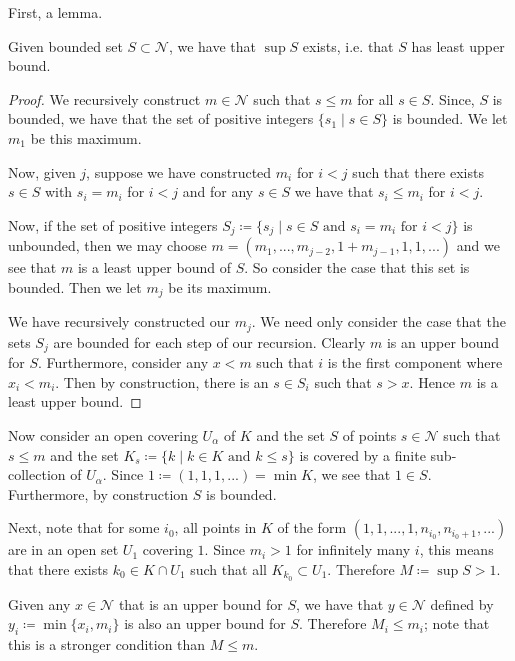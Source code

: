 First, a lemma. 
\begin{lemma}
Given bounded set \(S \subset \mathcal N\), we have that \(\sup S\) exists, i.e. that \(S\) has least
upper bound.
\end{lemma}
\begin{proof}
We recursively construct \(m \in \mathcal N\) such that \(s \leq m\) for all \(s \in S\). Since, \(S\) is
bounded, we have that the set of positive integers \(\{s_1 \mid s \in S\}\) is bounded. We let \(m_1\) be this
maximum. 

Now, given \(j\), suppose we have constructed \(m_i\) for \(i < j\) such that there exists \(s \in S\) with
\(s_i = m_i\) for \(i < j\) and for any \(s \in S\) we have that \(s_i \leq m_i\) for \(i < j\). 

Now, if the set of positive integers
\(S_j \coloneqq \{s_j \mid s \in S \text{ and } s_i = m_i \text{ for } i < j\}\) is unbounded, then we may choose 
\(m = (m_1,..., m_{j-2}, 1 + m_{j-1}, 1, 1, ...)\) and we see that \(m\) is a least upper bound of \(S\).
So consider the case that this set is bounded. Then we let \(m_j\) be its maximum.

We have recursively constructed our \(m_j\). We need only consider the case that the sets \(S_j\) are bounded
for each step of our recursion. Clearly \(m\) is an upper bound for \(S\). Furthermore, consider any \(x < m\)
such that \(i\) is the first component where \(x_i < m_i\). Then by construction, there is an \(s \in S_i\) such
that \(s > x\). Hence \(m\) is a least upper bound. 
\end{proof}

Now consider an open covering \(U_\alpha\) of \(K\) and the set \(S\) of points \(s \in \mathcal N\) such
that \(s \leq m\) and the set \(K_s \coloneqq \{k \mid k \in K \text{ and } k \leq s\}\) is covered by a
finite sub-collection of \(U_\alpha\). Since \(1 \coloneqq (1, 1, 1, ...) = \min K\), we see that \(1 \in S\).
Furthermore, by construction \(S\) is bounded. 

Next, note that for some \(i_0\), all points in \(K\) of the form \((1, 1, ..., 1, n_{i_0}, n_{i_0 + 1}, ...)\)
are in an open set \(U_1\) covering \(1\). Since \(m_i > 1\) for infinitely many \(i\), this means that there
exists \(k_0 \in K \cap U_1\) such that all \(K_{k_0} \subset U_1\). Therefore \(M \coloneqq \sup S > 1\).

Given any \(x \in \mathcal N\) that is an upper bound for \(S\), we have that \(y \in \mathcal N\) defined by
\(y_i \coloneqq \min \{x_i, m_i\}\) is also an upper bound for \(S\). Therefore \(M_i \leq m_i\); note that
this is a stronger condition than \(M \leq m\). 


